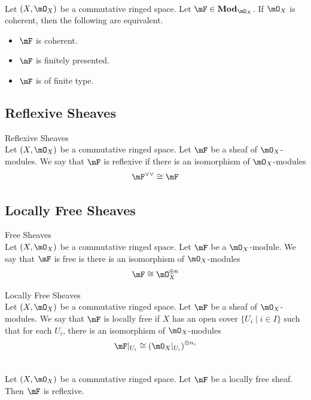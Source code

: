 \documentclass[a4paper]{article}
\begin{document}
\begin{prp}{}{}\\
Let $(X,\mO_X)$ be a commutative ringed space. Let $\mF\in\bold{Mod}_{\mO_X}$. If $\mO_X$ is coherent, then the following are equivalent. 
\begin{itemize}
\item $\mF$ is coherent. 
\item $\mF$ is finitely presented. 
\item $\mF$ is of finite type. 
\end{itemize}
\end{prp}

\subsection{Reflexive Sheaves}
\begin{defn}{Reflexive Sheaves}{}\\
Let $(X,\mO_X)$ be a commutative ringed space. Let $\mF$ be a sheaf of $\mO_X$-modules. We say that $\mF$ is reflexive if there is an isomorphism of $\mO_X$-modules $$\mF^{\vee\vee}\cong\mF$$
\end{defn}

\subsection{Locally Free Sheaves}
\begin{defn}{Free Sheaves}{}\\
Let $(X,\mO_X)$ be a commutative ringed space. Let $\mF$ be a $\mO_X$-module. We say that $\mF$ is free is there is an isomorphism of $\mO_X$-modules $$\mF\cong\mO_X^{\oplus n}$$
\end{defn}

\begin{defn}{Locally Free Sheaves}{}\\
Let $(X,\mO_X)$ be a commutative ringed space. Let $\mF$ be a sheaf of $\mO_X$-modules. We say that $\mF$ is locally free if $X$ has an open cover $\{U_i\;|\;i\in I\}$ such that for each $U_i$, there is an isomorphism of $\mO_X$-modules $$\mF|_{U_i}\cong\left(\mO_X|_{U_i}\right)^{\oplus n_i}$$
\end{defn}

\begin{lmm}{}{}\\
Let $(X,\mO_X)$ be a commutative ringed space. Let $\mF$ be a locally free sheaf. Then $\mF$ is reflexive. 
\end{lmm}
\end{document}
